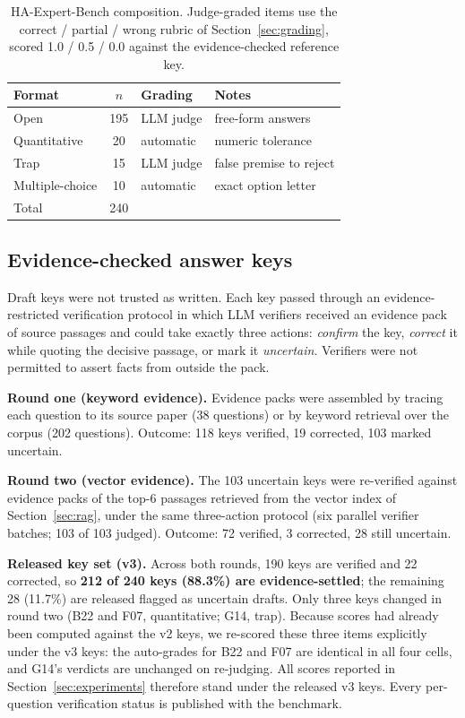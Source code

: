 \documentclass[11pt]{article}
\begin{document}
\begin{table}[t]
\centering
\begin{tabular}{lcll}
\toprule
Format & $n$ & Grading & Notes \\
\midrule
Open & 195 & LLM judge & free-form answers \\
Quantitative & 20 & automatic & numeric tolerance \\
Trap & 15 & LLM judge & false premise to reject \\
Multiple-choice & 10 & automatic & exact option letter \\
\midrule
Total & 240 & & \\
\bottomrule
\end{tabular}
\caption{HA-Expert-Bench composition. Judge-graded items use the
correct / partial / wrong rubric of Section~\ref{sec:grading}, scored
1.0 / 0.5 / 0.0 against the evidence-checked reference key.}
\label{tab:benchcomp}
\end{table}

\subsection{Evidence-checked answer keys}
\label{sec:keys}

Draft keys were not trusted as written. Each key passed through an
evidence-restricted verification protocol in which LLM verifiers received
an evidence pack of source passages and could take exactly three actions:
\emph{confirm} the key, \emph{correct} it while quoting the decisive
passage, or mark it \emph{uncertain}. Verifiers were not permitted to
assert facts from outside the pack.

\textbf{Round one (keyword evidence).} Evidence packs were assembled by
tracing each question to its source paper (38 questions) or by keyword
retrieval over the corpus (202 questions). Outcome: 118 keys verified,
19 corrected, 103 marked uncertain.

\textbf{Round two (vector evidence).} The 103 uncertain keys were
re-verified against evidence packs of the top-6 passages retrieved from
the vector index of Section~\ref{sec:rag}, under the same three-action
protocol (six parallel verifier batches; 103 of 103 judged). Outcome:
72 verified, 3 corrected, 28 still uncertain.

\textbf{Released key set (v3).} Across both rounds, 190 keys are verified
and 22 corrected, so \textbf{212 of 240 keys (88.3\%) are
evidence-settled}; the remaining 28 (11.7\%) are released flagged as
uncertain drafts. Only three keys changed in round two (B22 and F07,
quantitative; G14, trap). Because scores had already been computed
against the v2 keys, we re-scored these three items explicitly under the
v3 keys: the auto-grades for B22 and F07 are identical in all four cells,
and G14's verdicts are unchanged on re-judging. All scores reported in
Section~\ref{sec:experiments} therefore stand under the released v3 keys.
Every per-question verification status is published with the benchmark.
\end{document}
